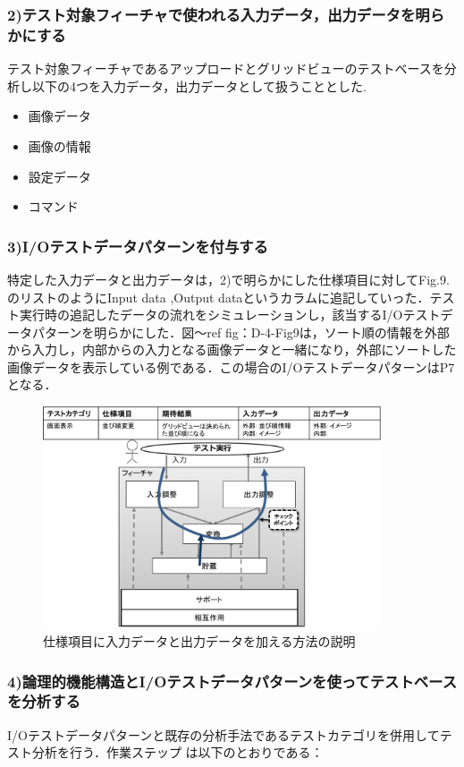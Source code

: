 \documentclass[a4paper,12pt]{jreport}
\begin{document}
\subsubsection{2)テスト対象フィーチャで使われる入力データ，出力データを明らかにする}
テスト対象フィーチャであるアップロードとグリッドビューのテストベースを分析し以下の4つを入力データ，出力データとして扱うこととした.
\begin{itemize}
 \item 画像データ
 \item 画像の情報
 \item 設定データ
  \item コマンド
\end{itemize}


\subsubsection{3)I/Oテストデータパターンを付与する}
特定した入力データと出力データは，2)で明らかにした仕様項目に対してFig.9.のリストのようにInput data ,Output dataというカラムに追記していった．テスト実行時の追記したデータの流れをシミュレーションし，該当するI/Oテストデータパターンを明らかにした．図〜ref {fig：D-4-Fig9}は，ソート順の情報を外部から入力し，内部からの入力となる画像データと一緒になり，外部にソートした画像データを表示している例である．この場合のI/OテストデータパターンはP7となる．
   \begin{figure}[htbp]
  \begin{center}
  \includegraphics[width=10cm]{./image/D-4-Fig9.png}
  \caption{仕様項目に入力データと出力データを加える方法の説明}
  \label{fig:D-4-Fig9}
  \end{center}
   \end{figure}



\subsubsection{4)論理的機能構造とI/Oテストデータパターンを使ってテストベースを分析する}
I/Oテストデータパターンと既存の分析手法であるテストカテゴリを併用してテスト分析を行う．作業ステップ
は以下のとおりである：
\end{document}
